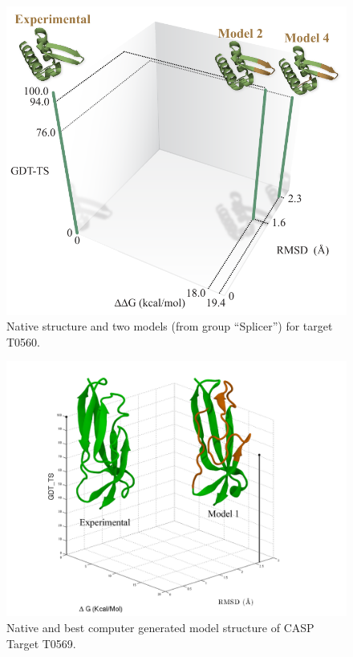 \documentclass[12pt]{article}
\begin{document}
\begin{figure}
    \begin{center}
        \includegraphics[width=3.5 in]{T0560.pdf}
    \end{center}
    \caption{Native structure and two models (from group ``Splicer'') for target T0560.}
    \label{fig:T0560}
\end{figure}


\begin{figure}
\begin{center}
\includegraphics[width=3.8 in,height=3.4 in]{T0569.pdf}
\end{center}
\caption{Native and best computer generated model structure of CASP Target T0569.} 
\label{fig:T0569}
\end{figure}
\end{document}
